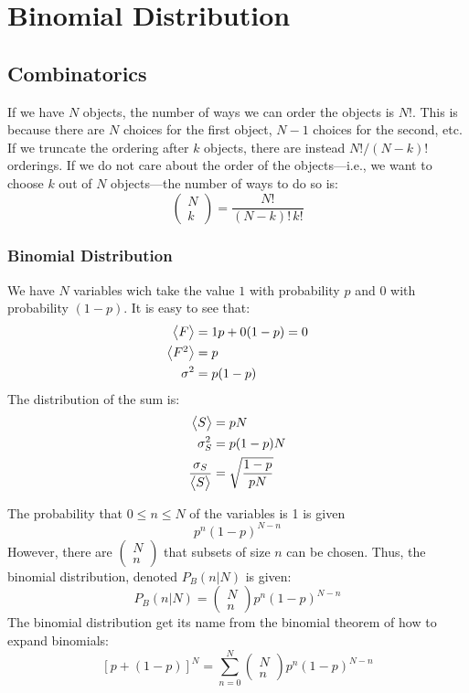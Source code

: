 \section{Binomial Distribution}
\subsection{Combinatorics}
If we have \(N\) objects, the number of ways we can order the objects is \(N! \). This is because there are \(N\) choices for the first object, \(N-1\) choices for the second, etc. If we truncate the ordering after \(k\) objects, there are instead \(N!/(N-k)! \) orderings. If we do not care about the order of the objects---i.e., we want to choose \(k\) out of \(N\) objects---the number of ways to do so is:
\begin{equation}
	\begin{pmatrix}
		N\\k
	\end{pmatrix}
=\frac{N!}{(N-k)!\, k!}\label{eq2:nCr}
\end{equation}

\subsubsection{Binomial Distribution}
We have \(N\) variables wich take the value \(1\) with probability \(p\) and \(0\) with probability \((1-p)\). It is easy to see that:
\begin{align*}
	\left\langle \begin{matrix}F\end{matrix} \right\rangle&=1p+0(1-p)=0\\
	\left\langle \begin{matrix}F^2\end{matrix} \right\rangle&=p\\
	\sigma^2&=p(1-p)
\end{align*}
The distribution of the sum is: 
\begin{align*}
	\left\langle \begin{matrix}S\end{matrix} \right\rangle&=pN\\
	\sigma_S^2&=p(1-p)N\\
	\frac{\sigma_S}{\left\langle \begin{matrix}S\end{matrix} \right\rangle}&=\sqrt{\frac{1-p}{pN}}
\end{align*}


The probability that \(0\le n \le N\) of the variables is 1 is given
\[p^n (1-p)^{N-n}\]
However, there are \(\begin{pmatrix}N\\n\end{pmatrix}\) that subsets of size \(n\) can be chosen. Thus, the binomial distribution, denoted \(P_B(n|N)\) is given:
\begin{equation}
	P_B(n|N)=\begin{pmatrix}N\\n\end{pmatrix}p^n(1-p)^{N-n}\label{eq2:binomial}
\end{equation}
The binomial distribution get its name from the binomial theorem of how to expand binomials:
\[[p+(1-p)]^N=\sum_{n=0}^N\begin{pmatrix}N\\n\end{pmatrix}p^n(1-p)^{N-n}\]

